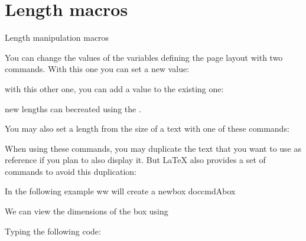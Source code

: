 \chapter{Length macros}

Length manipulation macros

You can change the values of the variables defining the page layout with two commands. With this one you can set a new value:

\begin{teX}
\setlength{parameter}{length}
\end{teX}


with this other one, you can add a value to the existing one:

\begin{teX}
\addtolength{parameter}{length}
\end{teX}

new lengths can becreated using the .

\begin{teX}
\end{teX}

You may also set a length from the size of a text with one of these commands:


\begin{teX}
 \settowidth{parameter}{some text}
\end{teX}

When using these commands, you may duplicate the text that you want to use as reference if you plan to also display it. But LaTeX also provides a set of commands to avoid this duplication:


In the following example ww will create a newbox doccmd{Abox}

\begin{teX}
\newsavebox{\Abox}
\savebox{\Abox}{\parbox{2in}{\lorem}}
\usebox{\Abox} \hspace{1cm} \usebox{\Abox}
\end{teX}


We can view the dimensions of the box using

\begin{teX}
\showthe\Abox
\showthe\wd\Abox
\showthe\ht\Abox
\showthe\dp\Abox
\end{teX}


\noindent Typing the following code:
\begin{teX}
\newsavebox{\Abox}
\savebox{\Abox}{\parbox{2in}{\lorem}}
\usebox{\Abox} \hspace{0.6cm} \usebox{\Abox}
\end{teX}

